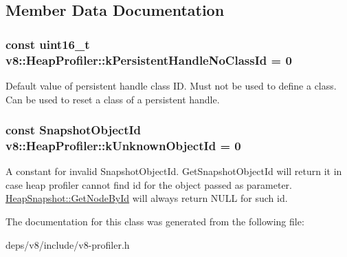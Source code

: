 \subsection{Member Data Documentation}
\hypertarget{classv8_1_1_heap_profiler_a272c9af3ea5cd90a2737af3d22a7eb78}{}
\subsubsection[{k\+Persistent\+Handle\+No\+Class\+Id}]{\setlength{\rightskip}{0pt plus 5cm}const uint16\+\_\+t v8\+::\+Heap\+Profiler\+::k\+Persistent\+Handle\+No\+Class\+Id = 0\hspace{0.3cm}{\ttfamily [static]}}\label{classv8_1_1_heap_profiler_a272c9af3ea5cd90a2737af3d22a7eb78}
Default value of persistent handle class I\+D. Must not be used to define a class. Can be used to reset a class of a persistent handle. \hypertarget{classv8_1_1_heap_profiler_abf2b9d8facb18473f9b124ab8baf5786}{}
\subsubsection[{k\+Unknown\+Object\+Id}]{\setlength{\rightskip}{0pt plus 5cm}const Snapshot\+Object\+Id v8\+::\+Heap\+Profiler\+::k\+Unknown\+Object\+Id = 0\hspace{0.3cm}{\ttfamily [static]}}\label{classv8_1_1_heap_profiler_abf2b9d8facb18473f9b124ab8baf5786}
A constant for invalid Snapshot\+Object\+Id. Get\+Snapshot\+Object\+Id will return it in case heap profiler cannot find id for the object passed as parameter. \hyperlink{classv8_1_1_heap_snapshot_a023696f94fe538380922bf2c40c97b7b}{Heap\+Snapshot\+::\+Get\+Node\+By\+Id} will always return N\+U\+L\+L for such id. 

The documentation for this class was generated from the following file\+:\begin{DoxyCompactItemize}
\item 
deps/v8/include/v8-\/profiler.\+h\end{DoxyCompactItemize}
